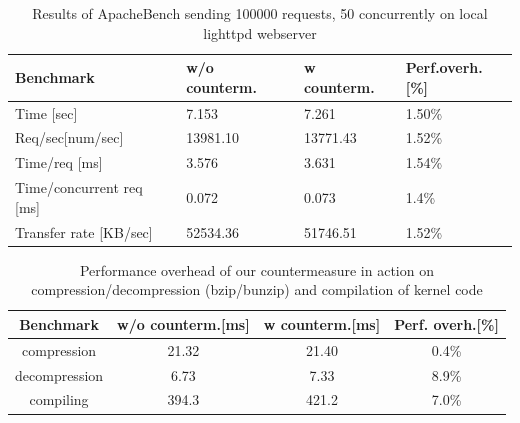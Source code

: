 \begin{center}
\vspace{3\baselineskip}
\begin{table}
\begin{tabular}{|l|l|l|l|}
\hline
\bf{Benchmark} & \bf{w/o counterm.} & \bf{w counterm.} & \bf{Perf.overh.[\%]} \\
\hline
Time [sec]				 &     7.153    &    7.261  &  1.50\% \\
\hline
Req/sec[num/sec]  &  13981.10 & 13771.43  & 1.52\% \\
\hline
Time/req [ms]    & 3.576 & 3.631  &  1.54\% \\
\hline
Time/concurrent req [ms] & 0.072 & 0.073  & 1.4\% \\
\hline
Transfer rate [KB/sec]        & 52534.36 & 51746.51   & 1.52\%
\\
\hline
\end{tabular}

\caption{{Results of ApacheBench sending 100000 requests, 50 concurrently on local lighttpd webserver}}
\label{apache}
\end{table}
\end{center}


\begin{table}[htdp]
\begin{center}
\begin{tabular}{|c|c|c|c|}
\hline
\bf{Benchmark} & \bf{w/o counterm.}[ms] & \bf{w counterm.}[ms] & \bf{Perf. overh.}[\%] \\
\hline
compression   & 21.32  & 21.40  & 0.4\% \\
\hline
decompression & 6.73   &  7.33  & 8.9\%\\
\hline
compiling   & 394.3  & 421.2  & 7.0\% \\
\hline
\end{tabular}
\end{center}
\caption{{Performance overhead of our countermeasure in action on compression/decompression (bzip/bunzip) and compilation of kernel code}}
\label{kernel}
\end{table}

